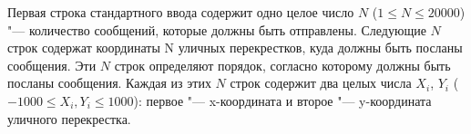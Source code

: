 Первая строка стандартного ввода содержит одно целое число $N$ ($1 \le N \le 20000$) "--- количество сообщений,
которые должны быть отправлены. Следующие $N$ строк содержат координаты N уличных перекрестков,
куда должны быть посланы сообщения. Эти $N$ строк определяют порядок, согласно которому должны
быть посланы сообщения. 
Каждая из этих $N$ строк содержит два целых числа $X_i$, $Y_i$ ($-1000 \le X_i, Y_i \le 1000$): 
первое "--- x-координата и второе "--- y-координата уличного перекрестка.

